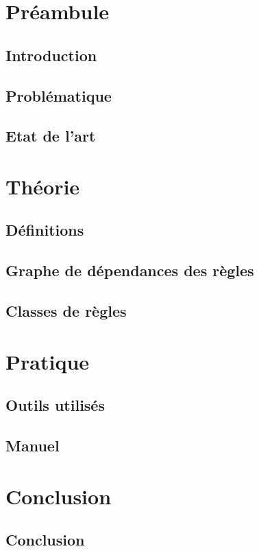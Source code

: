 \documentclass[a4paper]{report}
\begin{document}
\large
\setlength{\parskip}{5mm plus2mm minus2mm}
\lstset{language=Java, showstringspaces=false, numbers=left, numberstyle=\tiny, tabsize=4}




\chapter{Pr\'eambule}

\section{Introduction}\label{introduction}


\section{Probl\'ematique}\label{problematique}


\section{Etat de l'art}\label{etatart}



\chapter{Th\'eorie}

\section{D\'efinitions}\label{definitions}


\section{Graphe de d\'ependances des r\`egles}\label{grd}


\section{Classes de r\`egles}\label{classes_regles}



\chapter{Pratique}

\section{Outils utilis\'es}\label{outils_utilises}


\section{Manuel}\label{manuel}



\chapter{Conclusion}
\section{Conclusion}\label{conclusion}

\end{document}
